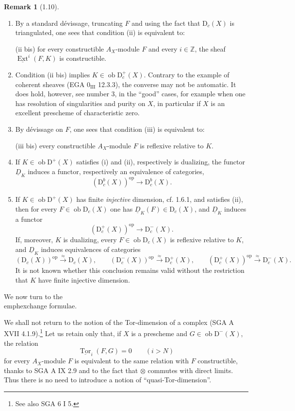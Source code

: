\documentclass[11pt,a4paper]{article}
\newcommand{\Z}{\mathbb{Z}}
\newcommand{\D}{\mathrm{D}}
\newcommand{\ob}{\operatorname{ob}}
\DeclareMathOperator{\Ext}{Ext}
\DeclareMathOperator{\Tor}{Tor}
\newcommand{\uExt}{\underline{\Ext}}
\newcommand{\uTor}{\underline{\Tor}}
\newcommand{\Ddual}{\underline{D}}
\theoremstyle{plain}
\theoremstyle{definition}
\newtheorem*{remarkstar}{Remark}
\begin{document}
\begin{remarkstar}[1.10]
\begin{enumerate}[label=\alph*)]
\item By a standard dévissage, truncating $F$ and using the fact that $\D_c(X)$ is triangulated, one sees that condition (ii) is equivalent to:

\smallskip
\noindent (ii bis) for every constructible $A_X$-module $F$ and every $i\in\Z$, the sheaf $\uExt^i(F,K)$ is constructible.

\item Condition (ii bis) implies $K\in\ob\D_c^+(X)$. Contrary to the example of coherent sheaves (EGA $0_{\mathrm{III}}$ 12.3.3), the converse may not be automatic. It does hold, however, see number 3, in the ``good'' cases, for example when one has resolution of singularities and purity on $X$, in particular if $X$ is an excellent prescheme of characteristic zero.

\item By dévissage on $F$, one sees that condition (iii) is equivalent to:

\smallskip
\noindent (iii bis) every constructible $A_X$-module $F$ is reflexive relative to $K$.

\item If $K\in\ob\D^+(X)$ satisfies (i) and (ii), respectively is dualizing, the functor $\Ddual_K$ induces a functor, respectively an equivalence of categories,
\[
(\D_c^b(X))^{\mathrm{op}}\longrightarrow \D_c^b(X).
\]

\item If $K\in\ob\D^+(X)$ has finite \emph{injective} dimension, cf. 1.6.1, and satisfies (ii), then for every $F\in\ob\D_c(X)$ one has $\Ddual_K(F)\in\D_c(X)$, and $\Ddual_K$ induces a functor
\[
(\D_c^+(X))^{\mathrm{op}}\longrightarrow \D_c^-(X).
\]
If, moreover, $K$ is dualizing, every $F\in\ob\D_c(X)$ is reflexive relative to $K$, and $\Ddual_K$ induces equivalences of categories
\[
(\D_c(X))^{\mathrm{op}}\xrightarrow{\approx}\D_c(X),\qquad
(\D_c^-(X))^{\mathrm{op}}\xrightarrow{\approx}\D_c^+(X),\qquad
(\D_c^+(X))^{\mathrm{op}}\xrightarrow{\approx}\D_c^-(X).
\]
It is not known whether this conclusion remains valid without the restriction that $K$ have finite injective dimension.
\end{enumerate}
\end{remarkstar}

We now turn to the \\emph{exchange formulae}.

We shall not return to the notion of the Tor-dimension of a complex (SGA A XVII 4.1.9).\footnote{See also SGA 6 I 5.} Let us retain only that, if $X$ is a prescheme and $G\in\ob\D^-(X)$, the relation
\[
\uTor_i(F,G)=0\qquad (i>N)
\]
for every $A_X$-module $F$ is equivalent to the same relation with $F$ constructible, thanks to SGA A IX 2.9 and to the fact that $\otimes$ commutes with direct limits. Thus there is no need to introduce a notion of ``quasi-Tor-dimension''.
\end{document}
